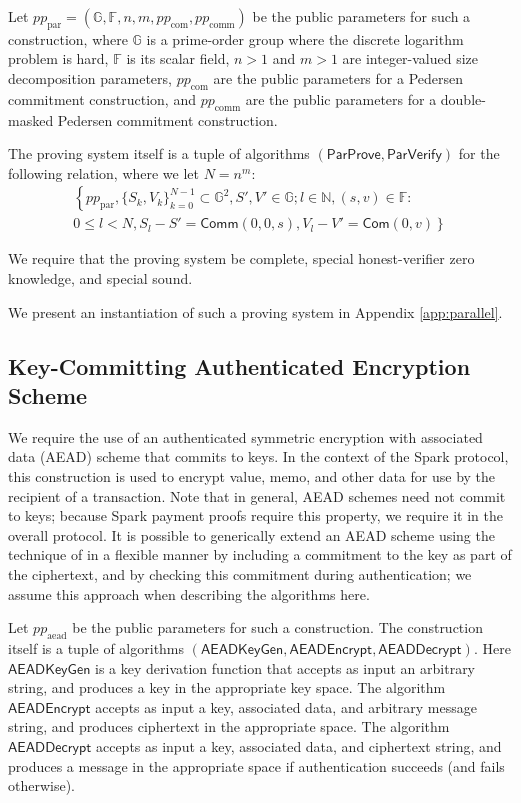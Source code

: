 \documentclass{llncs}
\newcommand{\G}{\mathbb{G}}
\newcommand{\F}{\mathbb{F}}
\newcommand{\func}[1]{\mathsf{#1}}
\newcommand{\com}{\func{Com}}
\newcommand{\comm}{\func{Comm}}
\begin{document}
Let $pp_{\text{par}} = (\G, \F, n, m, pp_{\text{com}}, pp_{\text{comm}})$ be the public parameters for such a construction, where $\G$ is a prime-order group where the discrete logarithm problem is hard, $\F$ is its scalar field, $n > 1$ and $m > 1$ are integer-valued size decomposition parameters, $pp_{\text{com}}$ are the public parameters for a Pedersen commitment construction, and $pp_{\text{comm}}$ are the public parameters for a double-masked Pedersen commitment construction.

The proving system itself is a tuple of algorithms $(\func{ParProve},\func{ParVerify})$ for the following relation, where we let $N = n^m$:
\begin{multline*}
\left\{ pp_{\text{par}}, \{S_k,V_k\}_{k=0}^{N-1} \subset \G^2, S',V' \in \G ; l \in \mathbb{N}, (s,v) \in \F : \right. \\
\left. 0 \leq l < N, S_l - S' = \comm(0,0,s), V_l - V' = \com(0,v) \right\}
\end{multline*}

We require that the proving system be complete, special honest-verifier zero knowledge, and special sound.

We present an instantiation of such a proving system in Appendix \ref{app:parallel}.


\subsection{Key-Committing Authenticated Encryption Scheme}

We require the use of an authenticated symmetric encryption with associated data (AEAD) scheme that commits to keys.
In the context of the Spark protocol, this construction is used to encrypt value, memo, and other data for use by the recipient of a transaction.
Note that in general, AEAD schemes need not commit to keys; because Spark payment proofs require this property, we require it in the overall protocol.
It is possible to generically extend an AEAD scheme using the technique of \cite{key_commitment} in a flexible manner by including a commitment to the key as part of the ciphertext, and by checking this commitment during authentication; we assume this approach when describing the algorithms here.

Let $pp_{\text{aead}}$ be the public parameters for such a construction.
The construction itself is a tuple of algorithms $(\func{AEADKeyGen},\func{AEADEncrypt},\func{AEADDecrypt})$.
Here $\func{AEADKeyGen}$ is a key derivation function that accepts as input an arbitrary string, and produces a key in the appropriate key space.
The algorithm $\func{AEADEncrypt}$ accepts as input a key, associated data, and arbitrary message string, and produces ciphertext in the appropriate space.
The algorithm $\func{AEADDecrypt}$ accepts as input a key, associated data, and ciphertext string, and produces a message in the appropriate space if authentication succeeds (and fails otherwise).
\end{document}
